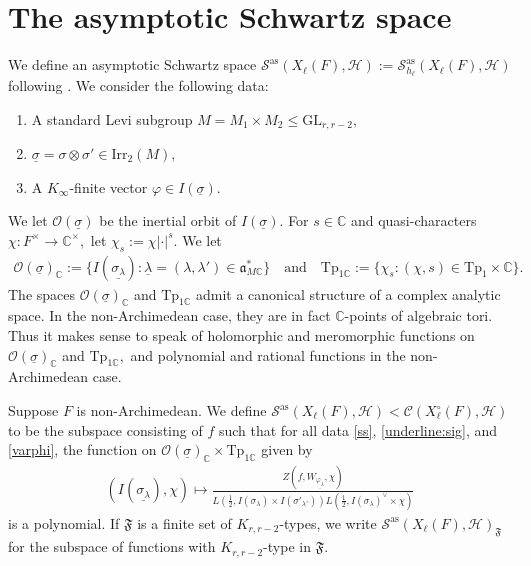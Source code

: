 \documentclass[12pt]{amsart}
\theoremstyle{remark}
\numberwithin{equation}{section}
\newcommand{\GL}{\mathrm{GL}}
\newcommand{\OO}{\mathcal{O}}
\newcommand{\CC}{\mathbb{C}}
\theoremstyle{definition}
\numberwithin{equation}{subsection}
\begin{document}
\section{The asymptotic Schwartz space} \label{sec:As}
We define an asymptotic Schwartz space  $\mathcal{S}^{\mathrm{as}}(X_\ell(F),\mathcal{H}):=\mathcal{S}_{h_\ell}^{\mathrm{as}}(X_{\ell}(F),\mathcal{H})$ following \cite{DRS:Schwartz}. We consider the following data: 
\begin{enumerate}
\item \label{ss} A standard Levi subgroup $M=M_1\times M_2\leq \GL_{r,r-2},$
\item \label{underline:sig} $\underline{\sigma}=\sigma \otimes \sigma' \in \mathrm{Irr}_2(M),$
\item \label{varphi} A $K_\infty$-finite vector $\varphi \in I(\underline{\sigma}).$
\end{enumerate}
We let $\mathcal{O}(\underline{\sigma})$ be the inertial orbit of $I(\underline{\sigma}).$ For $s \in \CC$ and quasi-characters $\chi:F^\times \to \CC^\times,$ let $\chi_s:=\chi|\cdot|^s.$
We let 
\begin{align*}
\mathcal{O}(\underline{\sigma})_{\CC}:=\{I(\underline{\sigma_{\lambda}}):\underline{\lambda}=(\lambda,\lambda') \in \mathfrak{a}_{M\CC}^*\}\quad\textrm{and}\quad
\mathrm{Tp}_{1\CC}:=\{\chi_s:(\chi,s) \in \mathrm{Tp}_{1} \times \CC\}.
\end{align*}
The spaces $\OO(\underline{\sigma})_{\CC}$ and $\mathrm{Tp}_{1\CC}$ admit a canonical structure of a complex analytic space.  In the non-Archimedean case, they are in fact $\CC$-points of algebraic tori.  Thus it makes sense to speak of holomorphic and meromorphic functions on $\OO(\underline{\sigma})_{\CC}$ and $\mathrm{Tp}_{1\CC},$ and polynomial and rational functions in the non-Archimedean case. 


 Suppose $F$ is non-Archimedean. We define $\mathcal{S}^{\mathrm{as}}(X_{\ell}(F),\mathcal{H}) <\mathcal{C}(X^\circ_\ell(F),\mathcal{H})$ to be the subspace consisting of $f$  such that 
 for all data \eqref{ss}, \eqref{underline:sig}, and \eqref{varphi}, 
 the function on $\mathcal{O}(\underline{\sigma})_{\CC} \times \mathrm{Tp}_{1\CC}$ given by 
\begin{align*}
(I(\underline{\sigma_\lambda}) , \chi) \longmapsto \frac{Z(f,W_{\underline{\varphi_{\lambda}}},\chi)}{L(\tfrac{1}{2},I(\sigma_\lambda) \times I(\sigma'_{\lambda'}))L(\tfrac{1}{2},I(\sigma_\lambda)^{\vee} \times \chi)}
\end{align*}
is a polynomial. 
If $\mathfrak{F}$ is a finite set of $K_{r,r-2}$-types, we write
$\mathcal{S}^{\mathrm{as}}(X_\ell(F),\mathcal{H})_{\mathfrak{F}}$ for the subspace of functions with $K_{r,r-2}$-type in $\mathfrak{F}.$
\end{document}
